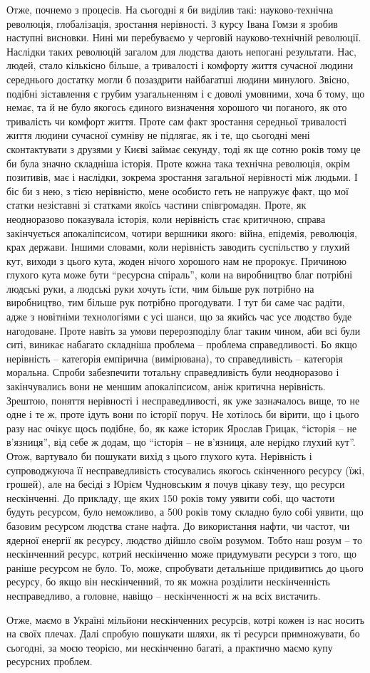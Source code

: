 Отже, почнемо з процесів. На сьогодні я би виділив такі: науково-технічна
революція, глобалізація, зростання нерівності. З курсу Івана Гомзи я зробив
наступні висновки. Нині ми перебуваємо у черговій науково-технічній революції.
Наслідки таких революцій загалом для людства дають непогані результати. Нас,
людей, стало кількісно більше, а тривалості і комфорту життя сучасної людини
середнього достатку могли б позаздрити найбагатші людини минулого. Звісно,
подібні зіставлення є грубим узагальненням і є доволі умовними, хоча б тому, що
немає, та й не було якогось єдиного визначення хорошого чи поганого, як ото
тривалість чи комфорт життя. Проте сам факт зростання середньої тривалості
життя людини сучасної сумніву не підлягає, як і те, що сьогодні мені
сконтактувати з друзями у Києві займає секунду, тоді як ще сотню років тому це
би була значно складніша історія. Проте кожна така технічна революція, окрім
позитивів, має і наслідки, зокрема зростання загальної нерівності між людьми. І
біс би з нею, з тією нерівністю, мене особисто геть не напружує факт, що мої
статки незіставні зі статками якоїсь частини співгромадян. Проте, як
неодноразово показувала історія, коли нерівність стає критичною, справа
закінчується апокаліпсисом, чотири вершники якого: війна, епідемія, революція,
крах держави. Іншими словами, коли нерівність заводить суспільство у глухий
кут, виходи з цього кута, жоден нічого хорошого нам не пророкує. Причиною
глухого кута може бути \enquote{ресурсна спіраль}, коли на виробництво благ потрібні
людські руки, а людські руки хочуть їсти, чим більше рук потрібно на
виробництво, тим більше рук потрібно прогодувати. І тут би саме час радіти,
адже з новітніми технологіями є усі шанси, що за якийсь час усе людство буде
нагодоване. Проте навіть за умови перерозподілу благ таким чином, аби всі були
ситі, виникає набагато складніша проблема – проблема справедливості. Бо якщо
нерівність – категорія емпірична (вимірювана), то справедливість – категорія
моральна. Спроби забезпечити тотальну справедливість були неодноразово і
закінчувались вони не меншим апокаліпсисом, аніж критична нерівність. Зрештою,
поняття нерівності і несправедливості, як уже зазначалось вище, то не одне і те
ж, проте ідуть вони по історії поруч. Не хотілось би вірити, що і цього разу
нас очікує щось подібне, бо, як каже історик Ярослав Грицак, \enquote{історія – не
в’язниця}, від себе ж додам, що \enquote{історія – не в’язниця, але нерідко глухий
кут}. Отож, вартувало би пошукати вихід з цього глухого кута. Нерівність і
супроводжуюча її несправедливість стосувались якогось скінченного ресурсу (їжі,
грошей), але на бесіді з Юрієм Чудновським я почув цікаву тезу, що ресурси
нескінченні. До прикладу, ще яких 150 років тому уявити собі, що частоти будуть
ресурсом, було неможливо, а 500 років тому складно було собі уявити, що базовим
ресурсом людства стане нафта. До використання нафти, чи частот, чи ядерної
енергії як ресурсу, людство дійшло своїм розумом. Тобто наш розум – то
нескінченний ресурс, котрий нескінченно може придумувати ресурси з того, що
раніше ресурсом не було. То, може, спробувати детальніше придивитись до цього
ресурсу, бо якщо він нескінченний, то як можна розділити нескінченність
несправедливо, а головне, навіщо – нескінченності ж на всіх вистачить.
 
Отже, маємо в Україні мільйони нескінченних ресурсів, котрі кожен із нас носить
на своїх плечах. Далі спробую пошукати шляхи, як ті ресурси примножувати, бо
сьогодні, за моєю теорією, ми нескінченно багаті, а практично маємо купу
ресурсних проблем.
